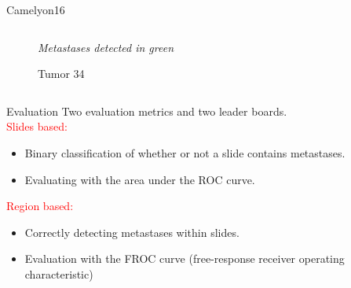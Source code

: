 \documentclass{beamer}
\begin{document}
\begin{frame}[noframenumbering]{Camelyon16}
\begin{columns}[T]
\begin{column}{.50\textwidth}
\begin{figure}[!ht]
\caption{Tumor 34}
{\footnotesize \textit{Metastases detected in green}}
\label{tumor_34}
\end{figure}
\end{column}%
\end{columns}

\end{frame}

\begin{frame}[noframenumbering]{Evaluation}
Two evaluation metrics and two leader boards. \\
\textcolor{red}{Slides based:}
\begin{itemize}
\item Binary classification of whether or not a slide contains metastases. \item Evaluating with the area under the ROC curve. 
\end{itemize}
\textcolor{red}{Region based:}
\begin{itemize}
\item Correctly detecting metastases within slides.
\item Evaluation with the FROC curve (free-response receiver operating characteristic)
\end{itemize}
\end{frame}
\end{document}
